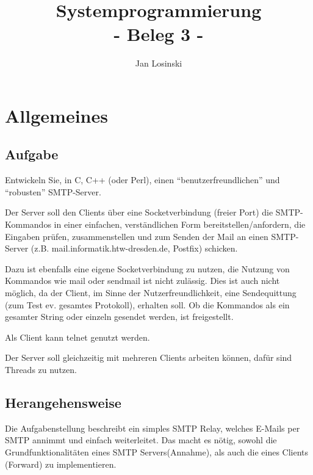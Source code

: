 \documentclass[pdftex,final,a4paper,10pt,notitlepage,halfparskip]{scrreprt}
\title{Systemprogrammierung\\
- Beleg 3 -}
\author{Jan Losinski}
\begin{document}
\maketitle

\tableofcontents

\chapter{Allgemeines}
\section{Aufgabe}
Entwickeln Sie, in C, C++ (oder Perl), einen "`benutzerfreundlichen"' und "`robusten"' SMTP-Server.

Der Server soll den Clients über eine Socketverbindung (freier Port) die SMTP-Kommandos in einer einfachen, verständlichen Form bereitstellen/anfordern, die Eingaben prüfen, zusammenstellen und zum Senden der Mail an einen SMTP-Server (z.B. mail.informatik.htw-dresden.de, Postfix) schicken. 

Dazu ist ebenfalls eine eigene Socketverbindung zu nutzen, die Nutzung von Kommandos wie mail oder sendmail ist nicht zulässig. Dies ist auch nicht möglich, da der Client, im Sinne der Nutzerfreundlichkeit, eine Sendequittung (zum Test ev. gesamtes Protokoll), erhalten soll. Ob die Kommandos als ein gesamter String oder einzeln gesendet werden, ist freigestellt.

Als Client kann telnet genutzt werden.

Der Server soll gleichzeitig mit mehreren Clients arbeiten können, dafür sind Threads zu nutzen.

\section{Herangehensweise}
Die Aufgabenstellung beschreibt ein simples SMTP Relay, welches E-Mails per SMTP annimmt und einfach weiterleitet. Das macht es nötig, sowohl die Grundfunktionalitäten eines SMTP Servers(Annahme), als auch die eines Clients (Forward) zu implementieren.
\end{document}
